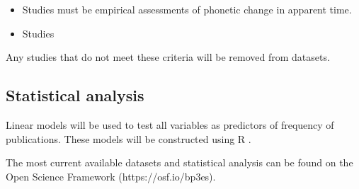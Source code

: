 \documentclass[review]{article}
\begin{document}
\begin{itemize}
	\item Studies must be empirical assessments of phonetic change in apparent time.
	\item Studies 
\end{itemize}

Any studies that do not meet these criteria will be removed from datasets.


\subsection{Statistical analysis}
Linear models will be used to test all variables as predictors of frequency of publications. These models will be constructed using R \cite{R2018}.

The most current available datasets and statistical analysis can be found on the Open Science Framework (https://osf.io/bp3es). 




\end{document}
